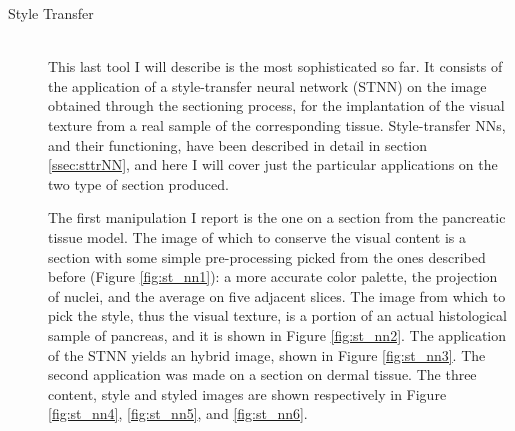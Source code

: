 \begin{description}
        \item [Style Transfer] \hfill \\
        This last tool I will describe is the most sophisticated so far. It consists of the application of a style-transfer neural network (STNN) on the image obtained through the sectioning process, for the implantation of the visual texture from a real sample of the corresponding tissue. Style-transfer NNs, and their functioning, have been described in detail in section \ref{ssec:sttrNN}, and here I will cover just the particular applications on the two type of section produced.

        The first manipulation I report is the one on a section from the pancreatic tissue model. The image of which to conserve the visual content is a section with some simple pre-processing picked from the ones described before (Figure \ref{fig:st_nn1}): a more accurate color palette, the projection of nuclei, and the average on five adjacent slices. The image from which to pick the style, thus the visual texture, is a portion of an actual histological sample of pancreas, and it is shown in Figure \ref{fig:st_nn2}. The application of the STNN yields an hybrid image, shown in Figure \ref{fig:st_nn3}. The second application was made on a section on dermal tissue. The three content, style and styled images are shown respectively in Figure \ref{fig:st_nn4}, \ref{fig:st_nn5}, and \ref{fig:st_nn6}.


\end{description}
